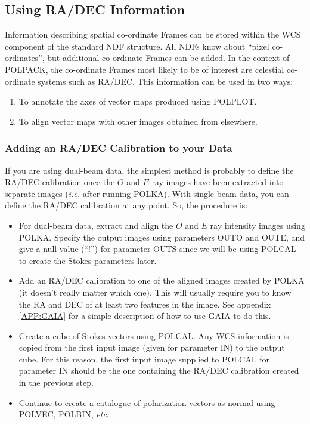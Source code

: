 \documentclass[twoside,11pt]{article}
\newcommand{\hyperref}[4]{#2\ref{#4}#3}
\newcommand{\htmlref}[2]{#1}
\newcommand{\xref}[3]{#1}
\newcommand{\xlabel}[1]{}
\renewcommand{\_}{\texttt{\symbol{95}}}
\begin{document}
\subsection{\label{SEC:WCS}\xlabel{usingradecinformation}Using RA/DEC Information}
Information describing spatial co-ordinate Frames can be stored within the 
WCS component of the standard NDF structure. All NDFs know about ``pixel
co-ordinates'', but additional co-ordinate Frames can be added. In the context 
of POLPACK, the co-ordinate Frames most likely to be of interest are celestial 
co-ordinate systems such as RA/DEC. This information can be used in two
ways:
\begin{enumerate}
\item To annotate the axes of vector maps produced using \htmlref{POLPLOT}{POLPLOT}.
\item To align vector maps with other images obtained from elsewhere.
\end{enumerate}

\subsubsection {Adding an RA/DEC Calibration to your Data}
If you are using dual-beam data, the simplest method is probably to define the 
RA/DEC calibration once the $O$ and $E$ ray images have been extracted into 
separate images (\emph{i.e.} after running POLKA). With single-beam data,
you can define the RA/DEC calibration at any point. So, the procedure is:

\begin{itemize}

\item For dual-beam data, extract and align the $O$ and $E$ ray intensity 
images using \htmlref{POLKA}{POLKA}. Specify the output images using 
parameters OUT\_O and OUT\_E, and give a null value (``!'') for parameter 
OUT\_S since we will be using \htmlref{POLCAL}{POLCAL} to create the Stokes 
parameters later.

\item Add an RA/DEC calibration to one of the aligned images 
created by POLKA (it doesn't really matter which one). This will usually 
require you to know the RA and DEC of at least two features in the image. 
See \hyperref{here}{appendix }{}{APP:GAIA} for a simple description of how 
to use \xref{GAIA}{sun214}{}  to do this.

\item Create a cube of Stokes vectors using \htmlref{POLCAL}{POLCAL}. Any
WCS information is copied from the first input image (given for parameter IN)
to the output cube. For this reason, the first input image supplied to 
POLCAL for parameter IN should be the one containing the RA/DEC calibration 
created in the previous step.

\item Continue to create a catalogue of polarization vectors as normal using 
\htmlref{POLVEC}{POLVEC}, \htmlref{POLBIN}{POLBIN}, \emph{etc}.

\end{itemize}
\end{document}
